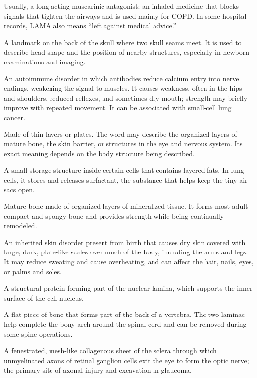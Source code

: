  Usually, a long-acting muscarinic antagonist: an inhaled medicine that blocks signals that tighten the airways and is used mainly for COPD. In some hospital records, LAMA also means “left against medical advice.”

 A landmark on the back of the skull where two skull seams meet. It is used to describe head shape and the position of nearby structures, especially in newborn examinations and imaging.

 An autoimmune disorder in which antibodies reduce calcium entry into nerve endings, weakening the signal to muscles. It causes weakness, often in the hips and shoulders, reduced reflexes, and sometimes dry mouth; strength may briefly improve with repeated movement. It can be associated with small-cell lung cancer.

 Made of thin layers or plates. The word may describe the organized layers of mature bone, the skin barrier, or structures in the eye and nervous system. Its exact meaning depends on the body structure being described.

 A small storage structure inside certain cells that contains layered fats. In lung cells, it stores and releases surfactant, the substance that helps keep the tiny air sacs open.

 Mature bone made of organized layers of mineralized tissue. It forms most adult compact and spongy bone and provides strength while being continually remodeled.

 An inherited skin disorder present from birth that causes dry skin covered with large, dark, plate-like
scales over much of the body, including the arms and legs. It may reduce sweating and cause overheating,
and can affect the hair, nails, eyes, or palms and soles.

 A structural protein forming part of the nuclear lamina, which supports the inner surface of the cell nucleus.

 A flat piece of bone that forms part of the back of a vertebra. The two laminae help complete the bony arch around the spinal cord and can be removed during some spine operations.

 A fenestrated, mesh-like collagenous sheet of the sclera through which unmyelinated axons of retinal ganglion cells exit the eye to form the optic nerve; the primary site of axonal injury and excavation in glaucoma.

